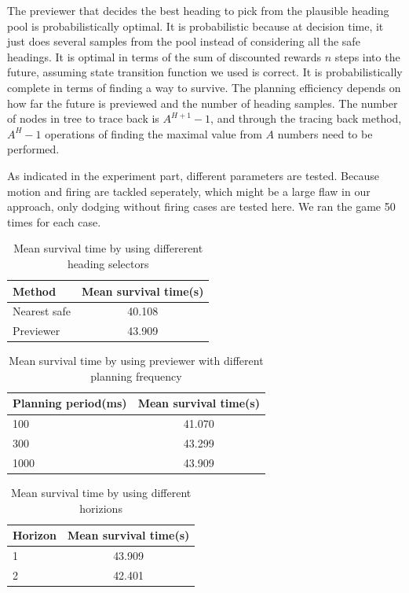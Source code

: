\documentclass[10pt,final,conference]{IEEEtran}
\begin{document}
The previewer that decides the best heading to pick from the plausible heading pool is probabilistically optimal. It is probabilistic because at decision time, it just does several samples from the pool instead of considering all the safe headings. It is optimal in terms of the sum of discounted rewards $n$ steps into the future, assuming state transition function we used is correct. It is probabilistically complete in terms of finding a way to survive. The planning efficiency depends on how far the future is previewed and the number of heading samples. The number of nodes in tree to trace back is $A^{H+1}-1$, and through the tracing back method, $A^H-1$ operations of finding the maximal value from $A$ numbers need to be performed.

As indicated in the experiment part, different parameters are tested. Because motion and firing are tackled seperately, which might be a large flaw in our approach, only dodging without firing cases are tested here. We ran the game 50 times for each case.


\begin{table}[!h]
\centering \small
\begin{tabular}{l|c}
  \hline
  Method &  Mean survival time(s)\\
  \hline \hline
  Nearest safe & 40.108 \\
  Previewer & 43.909 \\
  \hline
\end{tabular}
\caption{Mean survival time by using differerent heading selectors}
\label{differentmethod}
\end{table}


\begin{table}[!h]
\centering \small
\begin{tabular}{l|c}
  \hline
  Planning period(ms) &  Mean survival time(s)\\
  \hline \hline
  100 & 41.070 \\
  300 & 43.299\\
  1000 & 43.909\\
  \hline
\end{tabular}
\caption{Mean survival time by using previewer with different planning frequency}
\label{freq}
\end{table}

\begin{table}[!h]
\centering \small
\begin{tabular}{l|c}
  \hline
  Horizon &  Mean survival time(s)\\
  \hline \hline
  1 & 43.909 \\
  2 & 42.401\\
  \hline
\end{tabular}
\caption{Mean survival time by using different horizions}
\label{horizon}
\end{table}
\end{document}
